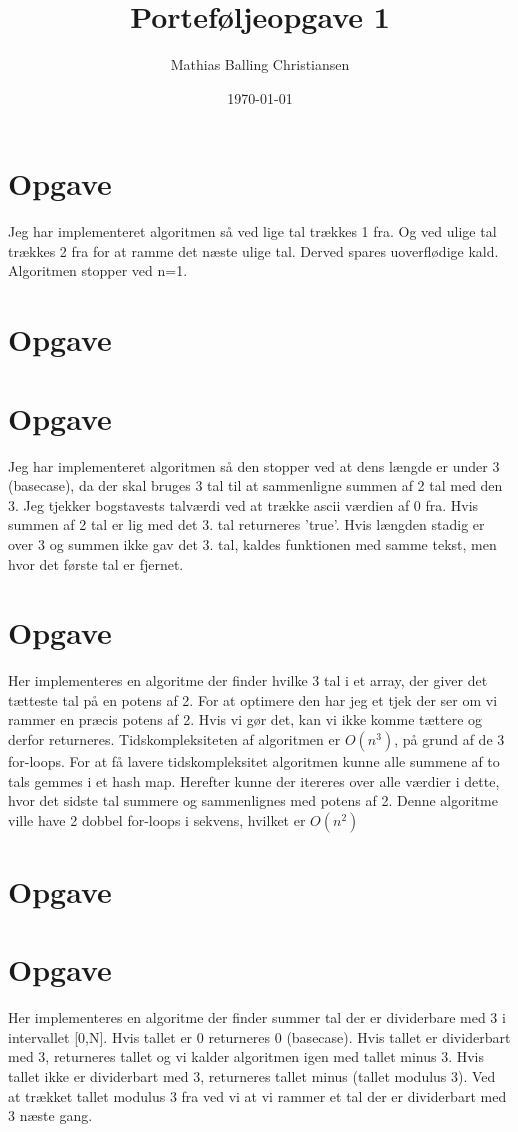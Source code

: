\documentclass{article}
\title{Porteføljeopgave 1}
\author{Mathias Balling Christiansen}
\date{\today}
\begin{document}
\maketitle
\tableofcontents
\newpage

\section{Opgave} %
Jeg har implementeret algoritmen så ved lige tal trækkes 1 fra. 
Og ved ulige tal trækkes 2 fra for at ramme det næste ulige tal.
Derved spares uoverflødige kald. Algoritmen stopper ved n=1.

\section{Opgave} %

\section{Opgave} %
Jeg har implementeret algoritmen så den stopper ved at dens længde er under 3 (basecase),
da der skal bruges 3 tal til at sammenligne summen af 2 tal med den 3.
Jeg tjekker bogstavests talværdi ved at trække ascii værdien af 0 fra.
Hvis summen af 2 tal er lig med det 3. tal returneres 'true'.
Hvis længden stadig er over 3 og summen ikke gav det 3. tal,
kaldes funktionen med samme tekst, men hvor det første tal er fjernet.

\section{Opgave} %
Her implementeres en algoritme der finder hvilke 3 tal i et array,
der giver det tætteste tal på en potens af 2.
For at optimere den har jeg et tjek der ser om vi rammer en præcis
potens af 2. Hvis vi gør det, kan vi ikke komme tættere og derfor returneres.
Tidskompleksiteten af algoritmen er $O(n^3)$, på grund af de 3 for-loops.
For at få lavere tidskompleksitet algoritmen kunne alle summene af 
to tals gemmes i et hash map. Herefter kunne der itereres over alle
værdier i dette, hvor det sidste tal summere og sammenlignes med potens af 2.
Denne algoritme ville have 2 dobbel for-loops i sekvens, hvilket er $O(n^2)$

\section{Opgave} %

\section{Opgave} %
Her implementeres en algoritme der finder summer tal der er dividerbare med 3
i intervallet [0,N].
Hvis tallet er 0 returneres 0 (basecase).
Hvis tallet er dividerbart med 3, returneres tallet og vi kalder algoritmen igen
med tallet minus 3. 
Hvis tallet ikke er dividerbart med 3, returneres tallet minus (tallet modulus 3).
Ved at trækket tallet modulus 3 fra ved vi at vi rammer et tal der er dividerbart
med 3 næste gang.
\end{document}
